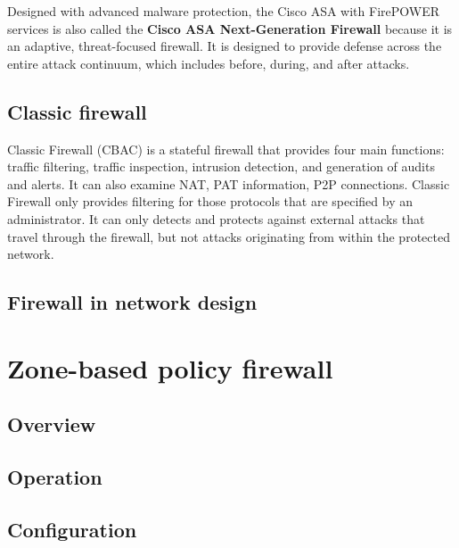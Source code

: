 Designed with advanced malware protection, the Cisco ASA with FirePOWER services is also called the \textbf{Cisco ASA Next-Generation Firewall} because it is an adaptive, threat-focused firewall. It is designed to provide defense across the entire attack continuum, which includes before, during, and after attacks.

\subsection{Classic firewall}

Classic Firewall (CBAC) is a stateful firewall that provides four main functions: traffic filtering, traffic inspection, intrusion detection, and generation of audits and alerts. It can also examine NAT, PAT information, P2P connections. Classic Firewall only provides filtering for those protocols that are specified by an administrator. It can only detects and protects against external attacks that travel through the firewall, but not attacks originating from within the protected network. 

\subsection{Firewall in network design}

\section{Zone-based policy firewall}

\subsection{Overview}

\subsection{Operation}

\subsection{Configuration}

